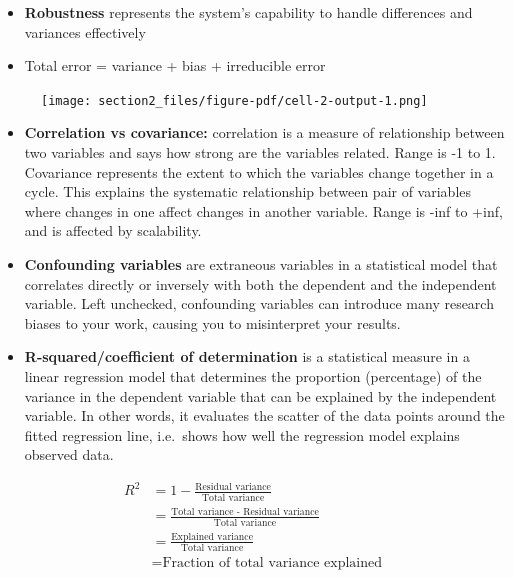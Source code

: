 \documentclass[
  letterpaper,
]{book}
\providecommand{\tightlist}{%
  \setlength{\itemsep}{0pt}\setlength{\parskip}{0pt}}\usepackage{longtable,booktabs,array}
\begin{document}
\begin{itemize}
\tightlist
\item
  \textbf{Robustness} represents the system's capability to handle
  differences and variances effectively
\item
  Total error = variance + bias + irreducible error
\end{itemize}

\begin{figure}

{\centering \texttt{[image: section2\_files/figure-pdf/cell-2-output-1.png]}

}

\end{figure}

\begin{itemize}
\tightlist
\item
  \textbf{Correlation vs covariance:} correlation is a measure of
  relationship between two variables and says how strong are the
  variables related. Range is -1 to 1. Covariance represents the extent
  to which the variables change together in a cycle. This explains the
  systematic relationship between pair of variables where changes in one
  affect changes in another variable. Range is -inf to +inf, and is
  affected by scalability.
\item
  \textbf{Confounding variables} are extraneous variables in a
  statistical model that correlates directly or inversely with both the
  dependent and the independent variable. Left unchecked, confounding
  variables can introduce many research biases to your work, causing you
  to misinterpret your results.
\item
  \textbf{R-squared/coefficient of determination} is a statistical
  measure in a linear regression model that determines the proportion
  (percentage) of the variance in the dependent variable that can be
  explained by the independent variable. In other words, it evaluates
  the scatter of the data points around the fitted regression line,
  i.e.~shows how well the regression model explains observed data.
\end{itemize}

\[\begin{aligned}
R^{2} &= 1 - \frac{\text{Residual variance}}{\text{Total variance}} \\
&=\frac{\text{Total variance - Residual variance}}{\text{Total variance}} \\
&=\frac{\text{Explained variance}}{\text{Total variance}} \\
&=\text{Fraction of total variance explained}
\end{aligned}\]
\end{document}
